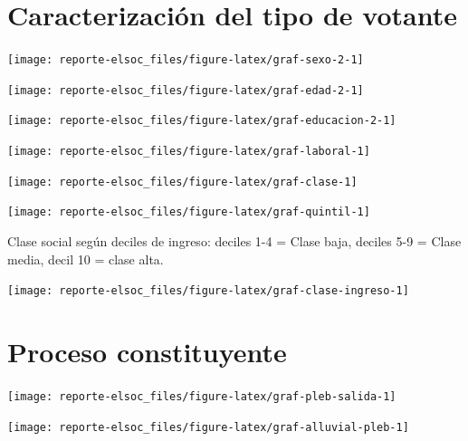 \documentclass[
  12pt,
]{book}
\begin{document}
\hypertarget{caracterizaciuxf3n-del-tipo-de-votante}{%
\section{Caracterización del tipo de votante}\label{caracterizaciuxf3n-del-tipo-de-votante}}

\begin{center}\texttt{[image: reporte-elsoc\_files/figure-latex/graf-sexo-2-1]} \end{center}

\begin{center}\texttt{[image: reporte-elsoc\_files/figure-latex/graf-edad-2-1]} \end{center}

\begin{center}\texttt{[image: reporte-elsoc\_files/figure-latex/graf-educacion-2-1]} \end{center}

\begin{center}\texttt{[image: reporte-elsoc\_files/figure-latex/graf-laboral-1]} \end{center}

\begin{center}\texttt{[image: reporte-elsoc\_files/figure-latex/graf-clase-1]} \end{center}

\begin{center}\texttt{[image: reporte-elsoc\_files/figure-latex/graf-quintil-1]} \end{center}

Clase social según deciles de ingreso: deciles 1-4 = Clase baja, deciles 5-9 = Clase media, decil 10 = clase alta.

\begin{center}\texttt{[image: reporte-elsoc\_files/figure-latex/graf-clase-ingreso-1]} \end{center}

\hypertarget{proceso-constituyente}{%
\section{Proceso constituyente}\label{proceso-constituyente}}

\begin{center}\texttt{[image: reporte-elsoc\_files/figure-latex/graf-pleb-salida-1]} \end{center}

\begin{center}\texttt{[image: reporte-elsoc\_files/figure-latex/graf-alluvial-pleb-1]} \end{center}
\end{document}
